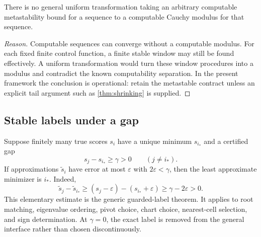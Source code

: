 \begin{barrier}\label{barrier:metastability}
There is no general uniform transformation taking an arbitrary computable metastability bound for a sequence to a computable Cauchy modulus for that sequence.
\end{barrier}

\begin{proof}[Reason]
Computable sequences can converge without a computable modulus.  For each fixed finite control function, a finite stable window may still be found effectively.  A uniform transformation would turn these window procedures into a modulus and contradict the known computability separation.  In the present framework the conclusion is operational: retain the metastable contract unless an explicit tail argument such as \cref{thm:shrinking} is supplied.
\end{proof}

\subsection{Stable labels under a gap}

Suppose finitely many true scores \(s_i\) have a unique minimum \(s_{i_*}\) and a certified gap
\[
 s_j-s_{i_*}\ge\gamma>0\qquad(j\ne i_*).
\]
If approximations \(\tilde s_i\) have error at most \(\varepsilon\) with \(2\varepsilon<\gamma\), then the least approximate minimizer is \(i_*\).  Indeed,
\[
 \tilde s_j-\tilde s_{i_*}
 \ge (s_j-\varepsilon)-(s_{i_*}+\varepsilon)
 \ge\gamma-2\varepsilon>0.
\]
This elementary estimate is the generic guarded-label theorem.  It applies to root matching, eigenvalue ordering, pivot choice, chart choice, nearest-cell selection, and sign determination.  At \(\gamma=0\), the exact label is removed from the general interface rather than chosen discontinuously.
